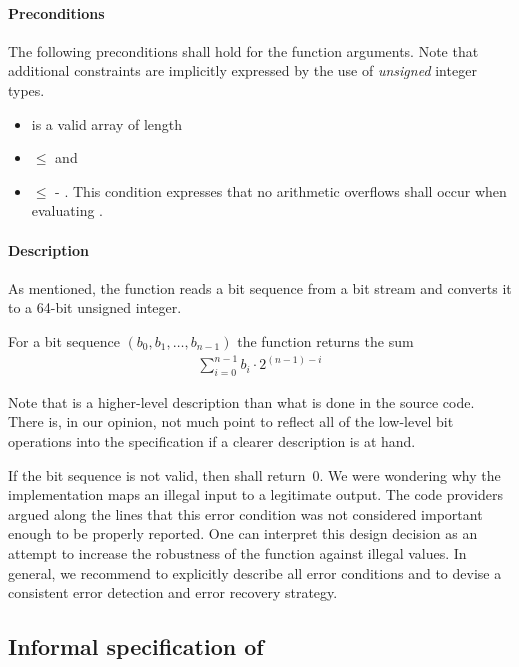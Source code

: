 \paragraph{Preconditions}
The following preconditions shall hold for the function arguments.
Note that additional constraints are implicitly expressed by the use
of \emph{unsigned} integer types.

\begin{itemize}
\item {} is a valid array of length 

\item {} $\leq$  and

\item {} $\leq$  - .
      This condition expresses that no arithmetic overflows shall occur
      when evaluating .
\end{itemize}

\paragraph{Description}
As mentioned, the function \peek reads a bit sequence from a bit stream
and converts it to a 64-bit unsigned integer.

For a bit sequence $(b_0, b_1,\ldots,b_{n - 1})$ the function \peek returns the sum
\begin{align}
\label{eq:peek-result}
    \sum_{i=0}^{n-1} b_i \cdot 2^{(n - 1) - i} 
\end{align}

Note that is a higher-level description than what is done in the source code.
There is, in our opinion, not much point to reflect all of the low-level bit operations
into the specification if a clearer description is at hand.

If the bit sequence is not valid, then \peek shall return~0.
We were wondering why the implementation maps an illegal input to a legitimate output.
The code providers argued along the lines that this error condition was not
considered important enough to be properly reported.
One can interpret this design decision as an attempt to increase the
robustness of the function against illegal values.
In general, we recommend to explicitly describe all error conditions
and to devise a consistent error detection and error recovery strategy.


\subsection{Informal specification of \poke}
\label{sec:informal-poke}

